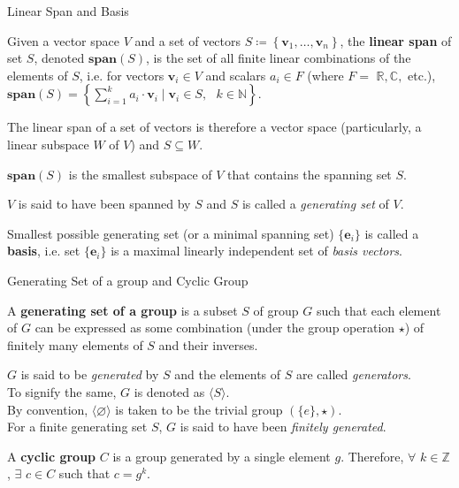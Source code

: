 \documentclass{beamer}
\newcommand\boldtext[1]{\textcolor{bolds}{\textbf{#1}}}
\newcommand\italictext[1]{\textcolor{italics}{\textit{#1}}}
\begin{document}
\begin{frame}{Linear Span and Basis}
    \begin{definition}
        Given a vector space $V$ and a set of vectors $S\coloneqq\left\{\mathbf{v}_1,\dots,\mathbf{v}_n\right\}$, the \boldtext{linear span} of set $S$, denoted $\mathbf{span}(S)$, is the set of all finite linear combinations of the elements of $S$, i.e. for vectors $\mathbf{v}_i \in {V}$ and scalars $a_i \in {F}$ (where $F=$ $\mathbb{R}, \mathbb{C},$ etc.), $\mathbf{span}(S)=\left\{\sum\limits_{i=1}^{k}a_i\cdot\mathbf{v}_i\mid\mathbf{v}_i \in {S},\text{ }k\in\mathbb{N}\right\}$.
    \end{definition}
    \vspace{-0.05em}
    The linear span of a set of vectors is therefore a vector space (particularly, a linear subspace $W$ of $V$) and $S\subseteq W$.
    \vspace{-0.05em}
    \begin{lemma}
        $\mathbf{span}(S)$ is the smallest subspace of $V$ that contains the spanning set $S$.
    \end{lemma}
    \vspace{-0.05em}
    $V$ is said to have been spanned by $S$ and $S$ is called a \italictext{generating set} of $V$.
    \begin{definition}
        Smallest possible generating set (or a minimal spanning set) $\{\mathbf{e}_i\}$ is called a \boldtext{basis}, i.e. set $\{\mathbf{e}_i\}$ is a maximal linearly independent set of \italictext{basis vectors}.
    \end{definition}
\end{frame}

\begin{frame}{Generating Set of a group and Cyclic Group}
    \begin{definition}
        A \boldtext{generating set of a group} is a subset $S$ of group $G$ such that each element of $G$ can be expressed as some combination (under the group operation $\star$) of finitely many elements of $S$ and their inverses.
    \end{definition}
    $G$ is said to be \italictext{generated} by $S$ and the elements of $S$ are called \italictext{generators}.\\
    To signify the same, $G$ is denoted as $\langle S\rangle$.\\
    By convention, $\langle\varnothing\rangle$ is taken to be the trivial group $(\{e\},\star)$.\\
    For a finite generating set $S$, $G$ is said to have been \italictext{finitely generated}.
    \begin{definition}
        A \boldtext{cyclic group} $C$ is a group generated by a single element $g$. Therefore, $\forall$ $k\in\mathbb{Z}$,  $\exists$ $c\in C$ such that $c=g^k$.
    \end{definition}
\end{frame}
\end{document}
